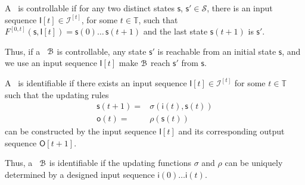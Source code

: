 \begin{definition}
	A \BCN\ is controllable if for any two distinct states $\mathsf{s}$, $\mathsf{s}' \in \mathcal{S}$, there is an input sequence $\mathsf{I}[t]\in\mathcal{I}^{[t]}$,  for some $t\in\mathbb{T}$, such that  $F^{[0,t]}(\mathsf{s}, \mathsf{I}[t])=\mathsf{s}(0) \ldots\, \mathsf{s}(t+1)$ and the last state  $\mathsf{s}(t+1)$ is $\mathsf{s}'$.
\end{definition}

Thus, if a \BCN\  ${\mathcal{B}}$ is  controllable,  any state $\mathsf{s}'$ is reachable from an initial state $\mathsf{s}$, and  we use an input  sequence $\mathsf{I}[t]$ make ${\mathcal{B}}$ reach $\mathsf{s}'$ from $\mathsf{s}$.

\begin{definition}%
A \BCN\ is identifiable if  there exists an input sequence $\mathsf{I}[t]\in\mathcal{I}^{[t]}$ for some $t \in \mathbb{T}$ such that the updating rules
	\begin{equation*}
    		\begin{split}
		\mathsf{s}(t+1)=&\sigma(\mathsf{i}(t),\mathsf{s}(t))\\
		\mathsf{o}(t)=&\rho(\mathsf{s}(t))
		\end{split}
	\end{equation*}
	can be constructed by the input  sequence  $\mathsf{I}[t]$ and its corresponding output sequence  $\mathsf{O}[t+1]$. 
\end{definition}

Thus, a \BCN\  ${\mathcal{B}}$ is identifiable if the updating functions $\sigma$ and $\rho$ can be uniquely determined by a  designed input sequence  $\mathsf{i}(0)\ldots \mathsf{i}(t)$.

